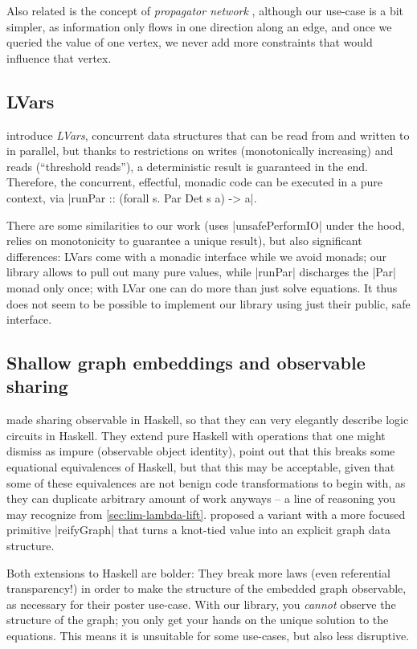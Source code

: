 \documentclass[manuscript,screen,acmsmall,nonacm]{acmart}
\begin{document}
Also related is the concept of \emph{propagator network} \citep{propagator}, although our use-case is a bit simpler, as information only flows in one direction along an edge, and once we queried the value of one vertex, we never add more constraints that would influence that vertex.

\subsection{LVars}

 introduce \emph{LVars}, concurrent data structures that can be read from and written to in parallel, but thanks to restrictions on writes (monotonically increasing) and reads (“threshold reads”), a deterministic result is guaranteed in the end. Therefore, the concurrent, effectful, monadic code can be executed in a pure context, via |runPar :: (forall s. Par Det s a) -> a|.

There are some similarities to our work (uses |unsafePerformIO| under the hood, relies on monotonicity to guarantee a unique result), but also significant differences: LVars come with a monadic interface while we avoid monads; our library allows to pull out many pure values, while |runPar| discharges the |Par| monad only once; with LVar one can do more than just solve equations. It thus does not seem to be possible to implement our library using just their public, safe interface.


\subsection{Shallow graph embeddings and observable sharing}

 made sharing observable in Haskell, so that they can very elegantly describe logic circuits in Haskell. They extend pure Haskell with operations that one might dismiss as impure (observable object identity), point out that this breaks some equational equivalences of Haskell, but that this may be acceptable, given that some of these equivalences  are not benign code transformations to begin with, as they can duplicate arbitrary amount of work anyways -- a line of reasoning you may recognize from \cref{sec:lim-lambda-lift}.  proposed a variant with a more focused primitive |reifyGraph| that turns a knot-tied value into an explicit graph data structure.

Both extensions to Haskell are bolder: They break more laws (even referential transparency!) in order to make the structure of the embedded graph observable, as necessary for their poster use-case. With our library, you \emph{cannot} observe the structure of the graph; you only get your hands on the unique solution to the equations. This means it is unsuitable for some use-cases, but also less disruptive.
\end{document}
